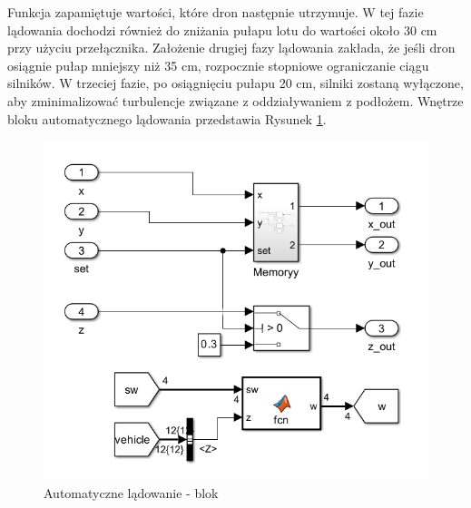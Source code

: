 \documentclass[polish,11pt,a4paper]{article}
\begin{document}
Funkcja zapamiętuje wartości, które dron następnie utrzymuje. W tej fazie lądowania dochodzi również do zniżania pułapu lotu do wartości około 30 cm przy użyciu przełącznika. Założenie drugiej fazy lądowania zakłada, że jeśli dron osiągnie pułap mniejszy niż 35 cm, rozpocznie stopniowe ograniczanie ciągu silników. W trzeciej fazie, po osiągnięciu pułapu 20 cm, silniki zostaną wyłączone, aby zminimalizować turbulencje związane z oddziaływaniem z podłożem. Wnętrze bloku automatycznego lądowania przedstawia Rysunek \ref{fig:lond}.
\begin{figure}[H]
	\centering
	\includegraphics[width=\linewidth]{lądowanie/lond.png}
	\caption{Automatyczne lądowanie - blok}
	\label{fig:lond}
	
\end{figure}
\end{document}

